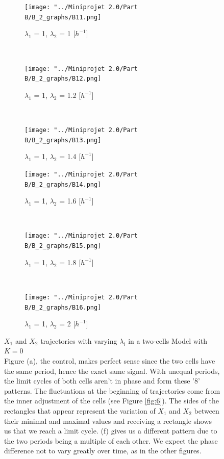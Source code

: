 \documentclass[10pt,a4paper,oneside,twocolumn]{article}
\numberwithin{equation}{section} %
\begin{document}
    \begin{figure}
    \centering
	\begin{subfigure}[b]{0.32\textwidth}
	    \texttt{[image: "../Miniprojet 2.0/Part B/B\_2\_graphs/B11.png]}
	    \caption{$\lambda_1$ = 1, $\lambda_2$ = 1 [$h^{-1}$]}
	\end{subfigure}
	~ 
	\begin{subfigure}[b]{0.32\textwidth}
	    \texttt{[image: "../Miniprojet 2.0/Part B/B\_2\_graphs/B12.png]}
	    \caption{$\lambda_1$ = 1, $\lambda_2$ = 1.2 [$h^{-1}$]}
	\end{subfigure}
	~ 
	\begin{subfigure}[b]{0.32\textwidth}
	    \texttt{[image: "../Miniprojet 2.0/Part B/B\_2\_graphs/B13.png]}
	    \caption{$\lambda_1$ = 1, $\lambda_2$ = 1.4 [$h^{-1}$]}
	\end{subfigure}
	 
	\begin{subfigure}[b]{0.32\textwidth}
	    \texttt{[image: "../Miniprojet 2.0/Part B/B\_2\_graphs/B14.png]}
	    \caption{$\lambda_1$ = 1, $\lambda_2$ = 1.6 [$h^{-1}$]}
	\end{subfigure}
	~ 
	\begin{subfigure}[b]{0.32\textwidth}
	    \texttt{[image: "../Miniprojet 2.0/Part B/B\_2\_graphs/B15.png]}
	    \caption{$\lambda_1$ = 1, $\lambda_2$ = 1.8 [$h^{-1}$]}
	\end{subfigure}
	~ 
	\begin{subfigure}[b]{0.32\textwidth}
	    \texttt{[image: "../Miniprojet 2.0/Part B/B\_2\_graphs/B16.png]}
	    \caption{$\lambda_1$ = 1, $\lambda_2$ = 2 [$h^{-1}$]}
	\end{subfigure}

	\caption{$X_1$ and $X_2$ trajectories with varying $\lambda_i$ in a two-cells Model with $K=0$\\
	Figure (a), the control, makes perfect sense since the two cells have the same period, hence the exact same signal. With unequal periods, the limit cycles of both cells aren't in phase and form these '8' patterns. The fluctuations at the beginning of trajectories come from the inner adjustment of the cells (see Figure \ref{fig:6}). The sides of the rectangles that appear represent the variation of $X_1$ and $X_2$  between their minimal and maximal values and receiving a rectangle shows us that we reach a limit cycle. (f) gives us a different pattern due to the two periods being a multiple of each other. We expect the phase difference not to vary greatly over time, as in the other figures. }
	\label{fig:11}
    \end{figure}
    
\end{document}
